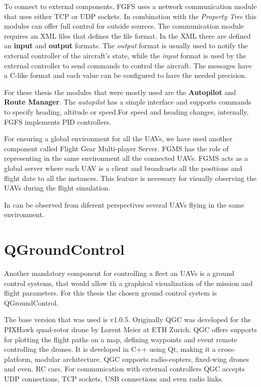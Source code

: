 To connect to external components, FGFS uses a network communication module
that uses either TCP or UDP sockets. In combination with the \textit{Property Tree}
this modules can offer full control for outside sources. The communication module
requires an XML files that defines the file format. In the XML there are defined
an \textbf{input} and \textbf{output} formats. The \textit{output} format is 
usually used to notify the external controller of the aircraft's state, while
the \textit{input} format is used by the external controller to send commands
to control the aircraft. The messages have a C-like format and each value can
be configured to have the needed precision.

For these thesis the modules that were mostly used are the \textbf{Autopilot} and
\textbf{Route Manager}. The \textit{autopilot} has a simple interface and supports
commands to specify heading, altitude or speed.For speed and heading changes,
internally, FGFS implements PID controllers.

For ensuring a global environment for all the UAVs, we have used another component
called Flight Gear Multi-player Server. FGMS has the role of representing in the
same environment all the connected UAVs. FGMS acts as a global server where each
UAV is a client and broadcasts all the positions and flight date to all the instances.
This feature is necessary for visually observing the UAVs during the flight 
simulation.

In  can be observed from diferent perspectives 
several UAVs flying in the same environment.


\section{QGroundControl}
\label{sec:qgc}

Another mandatory component for controlling a fleet an UAVs is a ground control
systems, that would allow th a graphical visualization of the mission and 
flight parameters. For this thesis the chosen ground control system is QGroundControl.

The base version that was used is v1.0.5. Originally QGC was developed
for the PIXHawk quad-rotor drone by Lorent Meier at ETH Zurich. QGC offers supports
for plotting the flight paths on a map, defining waypoints and event remote 
controlling the drones. It is developed in C++ using Qt, making it a cross-platform, 
modular architecture. QGC supports radio-copters, fixed-wing drones and even.
RC cars. For communication with external controllers QGC accepts UDP connections, 
TCP sockets, USB connections and even radio links.

